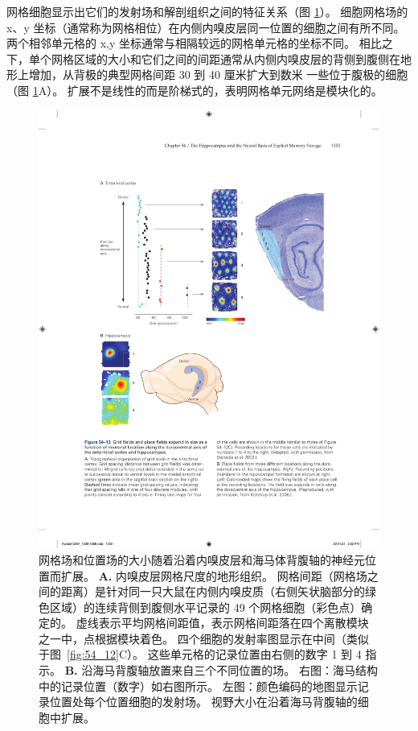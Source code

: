 网格细胞显示出它们的发射场和解剖组织之间的特征关系（图 \ref{fig:54_13}）。
细胞网格场的 x、y 坐标（通常称为网格相位）在内侧内嗅皮层同一位置的细胞之间有所不同。
两个相邻单元格的 x,y 坐标通常与相隔较远的网格单元格的坐标不同。
相比之下，单个网格区域的大小和它们之间的间距通常从内侧内嗅皮层的背侧到腹侧在地形上增加，从背极的典型网格间距 30 到 40 厘米扩大到数米 一些位于腹极的细胞（图 \ref{fig:54_13}A）。
扩展不是线性的而是阶梯式的，表明网格单元网络是模块化的。


\begin{figure}[htbp]
	\centering
	\includegraphics[width=0.8\linewidth]{chap54/fig_54_13}
	\caption{网格场和位置场的大小随着沿着内嗅皮层和海马体背腹轴的神经元位置而扩展。
		\textbf{A.} 内嗅皮层网格尺度的地形组织。
		网格间距（网格场之间的距离）是针对同一只大鼠在内侧内嗅皮质（右侧矢状脑部分的绿色区域）的连续背侧到腹侧水平记录的 49 个网格细胞（彩色点）确定的。
		虚线表示平均网格间距值，表示网格间距落在四个离散模块之一中，点根据模块着色。
		四个细胞的发射率图显示在中间（类似于图~\ref{fig:54_12}C）。
		这些单元格的记录位置由右侧的数字 1 到 4 指示\cite{stensola2012entorhinal}。
		\textbf{B.} 沿海马背腹轴放置来自三个不同位置的场。
		右图：海马结构中的记录位置（数字）如右图所示。
		左图：颜色编码的地图显示记录位置处每个位置细胞的发射场。
		视野大小在沿着海马背腹轴的细胞中扩展\cite{kjelstrup2008finite}。}
	\label{fig:54_13}
\end{figure}


